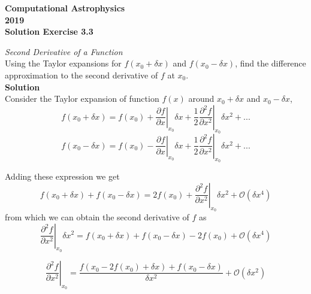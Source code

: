 \documentclass[11pt]{article}
\begin{document}
\begin{center}
\large \bf Computational Astrophysics \rm \\
2019\\
{\small Solution Exercise 3.3}
\end{center}

\textit{Second Derivative of a Function} \\
Using the Taylor expansions for $f(x_0 +\delta x)$ and $f(x_0 - \delta x)$, find the difference approximation to the second derivative of $f$ at $x_0$.\\

\textbf{Solution}\\
Consider the Taylor expansion of function $f(x)$ around $x_0 +\delta x$ and $x_0 - \delta x$,
\begin{equation}
f(x_0 + \delta x) = f(x_0) + \left.  \frac{\partial f}{\partial x} \right|_{x_0} \delta x + \frac{1}{2} \left.  \frac{\partial^2 f}{\partial x^2} \right|_{x_0} \delta x ^2 + ...
\end{equation}
\begin{equation}
f(x_0 - \delta x) = f(x_0) - \left.  \frac{\partial f}{\partial x} \right|_{x_0} \delta x + \frac{1}{2} \left.  \frac{\partial^2 f}{\partial x^2} \right|_{x_0} \delta x ^2 + ...
\end{equation}

Adding these expression we get
\begin{equation}
f(x_0 + \delta x) + f(x_0 - \delta x) = 2 f(x_0)  + \left.  \frac{\partial^2 f}{\partial x^2} \right|_{x_0} \delta x ^2 + \mathcal{O} (\delta x^4)
\end{equation}
from which we can obtain the second derivative of $f$ as
\begin{equation}
\left.  \frac{\partial^2 f}{\partial x^2} \right|_{x_0} \delta x ^2 = f(x_0 + \delta x) + f(x_0 - \delta x) - 2 f(x_0) + \mathcal{O} (\delta x^4)
\end{equation}

\begin{equation}
\left.  \frac{\partial^2 f}{\partial x^2} \right|_{x_0} = \frac{ f(x_0 - 2 f(x_0) + \delta x) + f(x_0 - \delta x)  }{\delta x ^2 } + \mathcal{O} (\delta x^2)
\end{equation}
\end{document}
